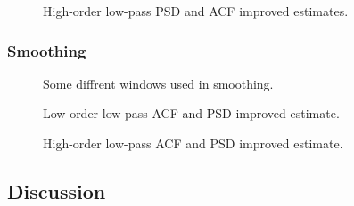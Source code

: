 \begin{figure}[!ht]
\centering

\caption{High-order low-pass PSD and ACF improved estimates.}
\label{fig:Lab1fig7}
\end{figure}


\subsubsection{Smoothing}

\begin{figure}[!ht]
\centering

\caption{Some diffrent windows used in smoothing.}
\label{fig:Lab1fig11}
\end{figure}

\begin{figure}[!ht]
\centering

\caption{Low-order low-pass ACF and PSD improved estimate.}
\label{fig:Lab1fig9}
\end{figure}

\begin{figure}[!ht]
\centering

\caption{High-order low-pass ACF and PSD improved estimate.}
\label{fig:Lab1fig10}
\end{figure}


\subsection{Discussion}

